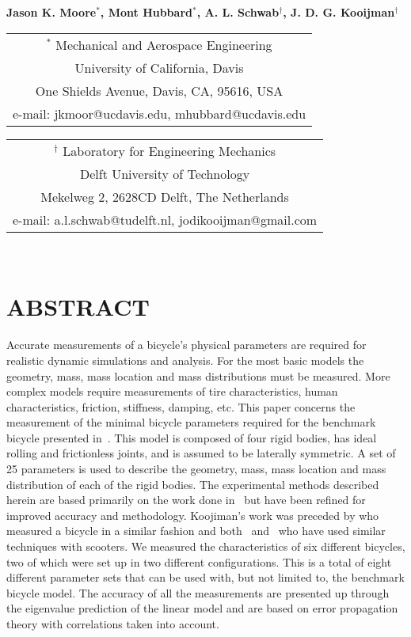\documentclass{bmd2010p}
\begin{document}
\begin{center}
\end{center}

\begin{center}
\normalsize{\bf{Jason K. Moore$^{*}$, Mont Hubbard$^{*}$, A. L. Schwab$^\dag$,
            J. D. G. Kooijman$^\dag$}}
\end{center}

\begin{center}
\begin{tabular}{c}
$^*$ Mechanical and Aerospace Engineering\\
University of California, Davis\\
One Shields Avenue, Davis, CA, 95616, USA\\
e-mail: jkmoor@ucdavis.edu, mhubbard@ucdavis.edu\\
\end{tabular}
\begin{tabular}{c}
$^\dag$ Laboratory for Engineering Mechanics\\
Delft University of Technology\\
Mekelweg 2, 2628CD Delft, The Netherlands\\
e-mail: a.l.schwab@tudelft.nl, jodikooijman@gmail.com\\
\end{tabular} \\ \vspace{2.5ex}
\end{center}
\section*{ABSTRACT}
Accurate measurements of a bicycle's physical parameters are required for
realistic dynamic simulations and analysis. For the most basic models the
geometry, mass, mass location and mass distributions must be measured. More complex models
require measurements of tire characteristics, human characteristics, friction, stiffness, damping, etc. This
paper concerns the measurement of the minimal bicycle parameters required for
the benchmark bicycle presented in~\cite{Meijaard2007}. This
model is composed of four rigid bodies, has ideal rolling and frictionless joints,
and is assumed to be laterally symmetric. A set of 25
parameters is used to describe the geometry, mass, mass location and
mass distribution of each of the rigid bodies. The experimental methods
described herein are based primarily on the work
done in~\cite{Kooijman2006} but have been refined for improved accuracy and
methodology. Koojiman's work was preceded by \cite{Roland1971} who measured a bicycle in a
similar fashion and both~\cite{Dohring1953} and~\cite{Singh1971} who have used
similar techniques with scooters. We measured the characteristics of six
different bicycles, two of which were set up in two different configurations.
This is a total of eight different parameter sets that can be used with, but not
limited to, the benchmark bicycle model. The accuracy of all the measurements
are presented up through the eigenvalue prediction of the linear model and are
based on error propagation theory with correlations taken into account.
\end{document}
